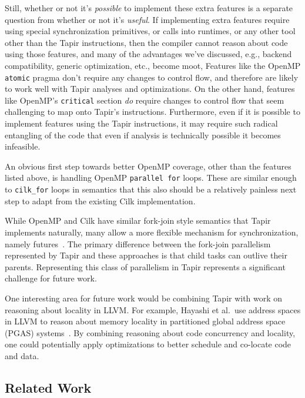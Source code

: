 \documentclass[sigconf]{acmart}
\begin{document}
Still, whether or not it's \emph{possible} to implement these extra features
is a separate question from whether or not it's \emph{useful}. If implementing
extra features require using special synchronization primitives, or calls into
runtimes, or any other tool other than the Tapir instructions, then the
compiler cannot reason about code using those features, and many of the
advantages we've discussed, e.g., backend compatibility, generic 
optimization, etc., become moot, Features like the OpenMP \texttt{atomic} pragma don't 
require any changes to control flow, and therefore are likely to work well 
with Tapir analyses and optimizations. On the other hand, features like OpenMP's
\texttt{critical} section \emph{do} require changes to control flow that seem
challenging to map onto Tapir's instructions. Furthermore, even if it
is possible to implement features using the Tapir instructions, it may require
such radical entangling of the code that even if analysis is technically
possible it becomes infeasible.

An obvious first step towards better OpenMP coverage, other than the features
listed above, is handling OpenMP \texttt{parallel for} loops. These are similar enough
to \texttt{cilk\_for} loops in semantics that this also should be a relatively
painless next step to adapt from the existing Cilk implementation.

While OpenMP and Cilk have similar fork-join style semantics that Tapir
implements naturally, many allow a more flexible mechanism for synchronization, namely
futures~\cite{qthreads, chapel, hpx}. The primary difference between the
fork-join parallelism represented by Tapir and these approaches is that
child tasks can outlive their parents. Representing this class
of parallelism in Tapir represents a significant challenge for future work.

One interesting area for future work would be combining Tapir with work on
reasoning about locality in LLVM. For example, Hayashi et al.\
use address spaces in LLVM to reason about memory
locality in partitioned global address space (PGAS) systems~\cite{hayashi2015llvm}. By combining
reasoning about code concurrency and locality, one could potentially apply
optimizations to better schedule and co-locate code and data.

\subsection{Related Work} \label{Sec:Related}
\end{document}
